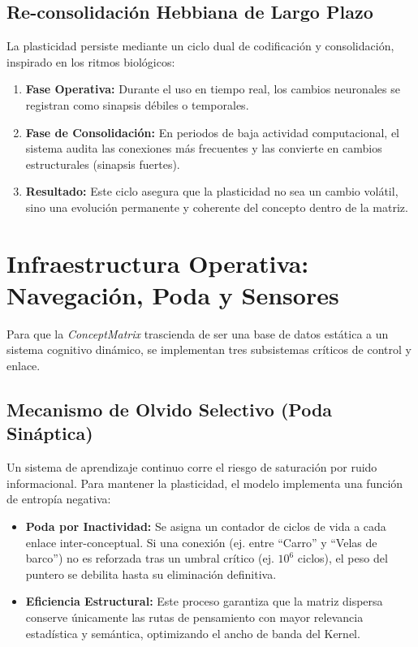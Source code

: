 \documentclass[12pt]{article}
\begin{document}
\subsection{Re-consolidación Hebbiana de Largo Plazo}
La plasticidad persiste mediante un ciclo dual de codificación y consolidación, inspirado en los ritmos biológicos:
\begin{enumerate}
    \item \textbf{Fase Operativa:} Durante el uso en tiempo real, los cambios neuronales se registran como sinapsis débiles o temporales.
    \item \textbf{Fase de Consolidación:} En periodos de baja actividad computacional, el sistema audita las conexiones más frecuentes y las convierte en cambios estructurales (sinapsis fuertes).
    \item \textbf{Resultado:} Este ciclo asegura que la plasticidad no sea un cambio volátil, sino una evolución permanente y coherente del concepto dentro de la matriz.
\end{enumerate}



\section{Infraestructura Operativa: Navegación, Poda y Sensores}

Para que la \textit{ConceptMatrix} trascienda de ser una base de datos estática a un sistema cognitivo dinámico, se implementan tres subsistemas críticos de control y enlace.

\subsection{Mecanismo de Olvido Selectivo (Poda Sináptica)}
Un sistema de aprendizaje continuo corre el riesgo de saturación por ruido informacional. Para mantener la plasticidad, el modelo implementa una función de entropía negativa:
\begin{itemize}
    \item \textbf{Poda por Inactividad:} Se asigna un contador de ciclos de vida a cada enlace inter-conceptual. Si una conexión (ej. entre ``Carro'' y ``Velas de barco'') no es reforzada tras un umbral crítico (ej. $10^6$ ciclos), el peso del puntero se debilita hasta su eliminación definitiva.
    \item \textbf{Eficiencia Estructural:} Este proceso garantiza que la matriz dispersa conserve únicamente las rutas de pensamiento con mayor relevancia estadística y semántica, optimizando el ancho de banda del Kernel.
\end{itemize}
\end{document}
